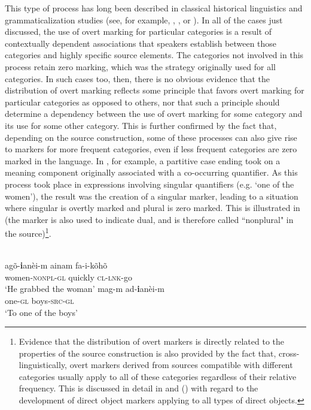\documentclass[output=paper]{langsci/langscibook}
\begin{document}
This type of process has long been described in classical historical
linguistics and grammaticalization  studies (see, for example, \citealt{Heineal.1991},
\citealt{Bybee-Perkins-Pagliuca1994}, or
\citealt{Traugott-Dasher2005}). In all of the cases just discussed, the use of overt
marking for particular categories is a result of contextually dependent 
associations that speakers  establish between those categories and
highly specific source elements. The categories  not involved in this
process retain zero marking,  which was the strategy originally used for
all categories. In such cases too,  then, there is no obvious
evidence that the
distribution of overt marking  reflects some principle that
favors overt marking for particular categories as opposed to others,
nor that such a principle should determine a dependency between the
use of overt marking for some category and its use for some other
category. This is further confirmed by the fact that, depending on the
source construction, some of these processes can also give rise to
markers for more frequent categories, even if less frequent categories
are zero marked in the language. In , for example, a partitive
case ending took on a meaning component originally associated with a
co-occurring quantifier. As this process took place in expressions
involving singular quantifiers (e.g. `one of the women'), the result was the creation
of a singular marker, leading to a situation where singular is overtly
marked and plural is zero marked. This is illustrated in  (the
marker is also used to indicate dual, and is therefore called 
``nonplural" in the source)\footnote{Evidence that the distribution of overt
    markers is directly related to the properties of the source
    construction is also provided by the fact that, cross-linguistically,
overt markers derived from
  sources compatible with different categories usually apply to all of
  these categories regardless of their relative 
  frequency. This is discussed in detail in \citet{Otareferential} and (\citeyear{Otacompetingmotivations})
  with regard to the
  development of direct object markers applying to all types of direct
  objects.}.

\ea\label{imonda}
\\
\ea 
\gll agõ-{\textbf ian\`ei}-m ainam fa-i-kõhõ \\
women-\textsc{nonpl}-\textsc{gl} quickly \textsc{cl}-\textsc{lnk}-go \\
\glt `He grabbed the woman' 
\ex
\gll mag-m ad-{\textbf ian\`ei}-m  \\
one-\textsc{gl} boys-\textsc{src}-\textsc{gl}  \\
\glt `To one of the boys' 
\z
\z
\end{document}
